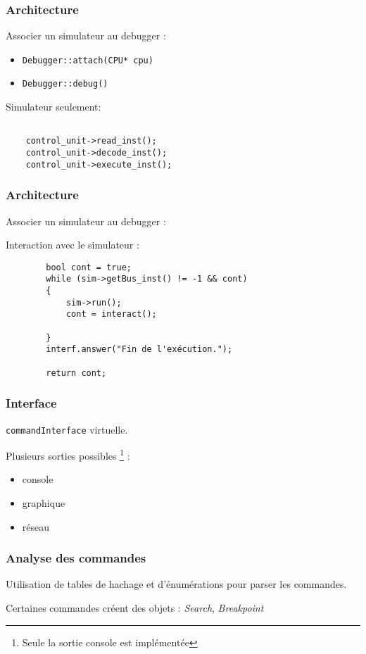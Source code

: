 \documentclass{beamer}
\begin{document}
\begin{frame}[fragile]
	\frametitle{Architecture}
	Associer un simulateur au debugger :

		\begin{itemize}
	\item \verb|Debugger::attach(CPU* cpu)|
	\item \verb|Debugger::debug()|
	\end{itemize}
	
	\begin{block}{Simulateur seulement:}
		\begin{verbatim}
			
    control_unit->read_inst();
    control_unit->decode_inst();
    control_unit->execute_inst();	
		\end{verbatim}
	\end{block}

\end{frame}

\begin{frame}[fragile]
	\frametitle{Architecture}
	Associer un simulateur au debugger :
	\begin{block}{Interaction avec le simulateur :}
	\begin{verbatim}
        bool cont = true;
        while (sim->getBus_inst() != -1 && cont)
        {
            sim->run();
            cont = interact();
            
        }
        interf.answer("Fin de l'exécution.");
        
        return cont;
		\end{verbatim}
	\end{block}
\end{frame}

\begin{frame}[fragile]
	\frametitle{Interface}
	\verb|commandInterface| virtuelle.

	Plusieurs sorties possibles \footnote{Seule la sortie console est implémentée} :
	\begin{itemize}
	\item console
	\item graphique
	\item réseau
	\end{itemize}
\end{frame}

\begin{frame}
	\frametitle{Analyse des commandes}
	Utilisation de tables de hachage et d'énumérations pour parser les commandes.
	
	Certaines commandes créent des objets : \emph{Search}, \emph{Breakpoint}
\end{frame}
\end{document}

